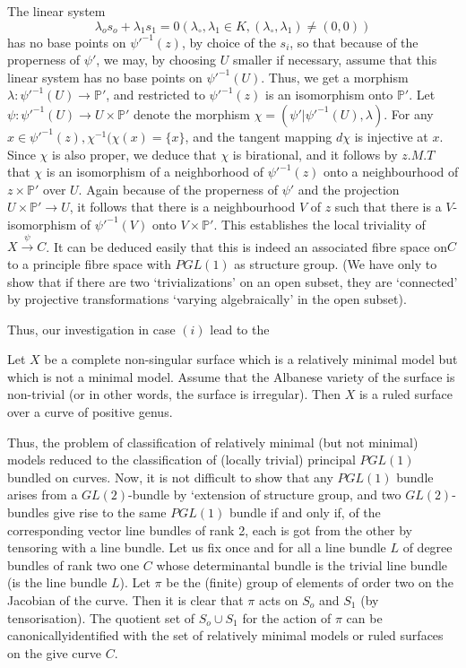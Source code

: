 The linear system
$$
\lambda_o s_o+\lambda_1s_1 = 0 (\lambda_\circ,\lambda_1 \in K,
(\lambda_\circ, \lambda_1) \neq (0,0))
$$
has no base points on $\psi'^{-1}(z)$, by choice of the $s_i$, so that
because of the properness of $\psi '$, we may, by choosing $U$ smaller
if necessary, assume that this linear system has no base points on
$\psi'^{-1}(U)$. Thus, we get a morphism $\lambda:\psi'^{-1}(U)\to
\mathbb{P}'$, and restricted to $\psi'^{-1}(z)$ is an isomorphism onto
$\mathbb{P}'$. Let  $\psi :\psi'^{-1}(U)\to U \times \mathbb{P}'$
denote the morphism $\chi=(\psi'|\psi'^{-1}(U), \lambda)$. For any $x
\in \psi'^{-1}(z),\chi^{-1}(\chi(x)=\{x\}$, and the tangent mapping
$d\chi$ is injective at $x$. Since $\chi$ is also proper, we deduce
that $\chi$ is birational, and it follows by $z.M.T$ that $\chi$ is an
isomorphism of a neighborhood of $\psi'^{-1}(z)$ onto a neighbourhood of
$z \times \mathbb{P}'$ over $U$. Again because of the properness of
$\psi'$ and the projection $U \times \mathbb{P}'\to U$, it follows that
there is a neighbourhood $V$ of $z$ such that there is a
$V$-isomorphism of $\psi'^{-1} (V)$ onto $V \times \mathbb{P}'$. This
establishes the local
triviality of $X \overset{\psi}\to C$. It can be deduced easily that
this is indeed an associated fibre space on\pageoriginale $C$ to a principle fibre
space with $PGL(1)$ as structure group. (We have only to show that if
there are two `trivializations' on an open subset, they are `connected'
by projective transformations `varying algebraically' in the open
subset). 

Thus, our investigation in case $(i)$ lead to the  

\begin{theorem*}%
  Let $X$ be a complete non-singular surface which is a
    relatively minimal model but which is not a minimal model. Assume
    that the Albanese variety of the surface is non-trivial (or in other
    words, the surface is irregular). Then $X$ is a ruled surface over
    a curve of positive genus.   
\end{theorem*}

Thus, the problem of classification of relatively minimal (but not
minimal) models reduced to the classification of (locally trivial)
principal $PGL(1)$ bundled on curves. Now, it is not difficult to show
that any $PGL(1)$ bundle arises from a $GL(2)$-bundle by `extension of
structure group, and two $GL(2)$-bundles give rise to the same
$PGL(1)$ bundle if and only if, of the corresponding vector line
bundles of rank 2, each is got from the other by tensoring with a
line bundle. Let us fix once and for all a line bundle $L$ of degree
bundles of rank two one $C$ whose determinantal bundle is the trivial
line bundle (\resp is the line bundle $L$). Let $\pi$  be the (finite)
group of elements of order two on the Jacobian of the curve. Then it is
clear that $\pi$ acts on $S_o$ and $S_1$ (by tensorisation). The
quotient set of $S_o \cup S_1$ for the action of $\pi$ can be
canonically\pageoriginale identified with the set of relatively minimal models or
ruled surfaces on the give curve $C$. 

